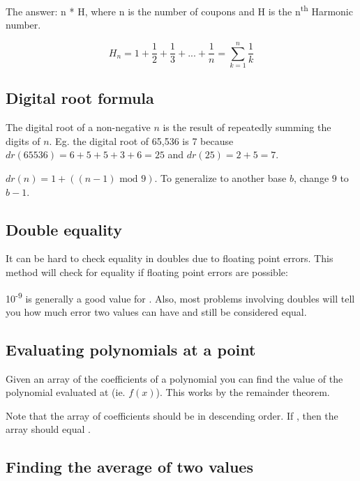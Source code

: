 The answer: n * H, where n is the number of coupons and H is the n\textsuperscript{th} Harmonic number.

$$H_n = 1 + \frac{1}{2} + \frac{1}{3} + ... + \frac{1}{n} = \sum_{k=1}^n \frac{1}{k}$$

\subsection*{Digital root formula}

The digital root of a non-negative $n$ is the result of repeatedly summing the digits of $n$. Eg. the digital root of 65,536 is 7 because $dr(65536) = 6+5+5+3+6 = 25$ and $dr(25) = 2+5 = 7$. 

$dr(n) = 1 + ((n-1) \text{ mod } 9)$. To generalize to another base $b$, change $9$ to $b-1$.

\subsection*{Double equality}

It can be hard to check equality in doubles due to floating point errors. This method will check for equality if floating point errors are possible:



10\textsuperscript{-9} is generally a good value for . Also, most problems involving doubles will tell you how much error two values can have and still be considered equal.

\subsection*{Evaluating polynomials at a point}

Given an array of the coefficients of a polynomial you can find the value of the polynomial evaluated at  (ie. $f(x)$). This works by the remainder theorem.



Note that the array of coefficients should be in descending order. If , then the array should equal .

\subsection*{Finding the average of two values}

